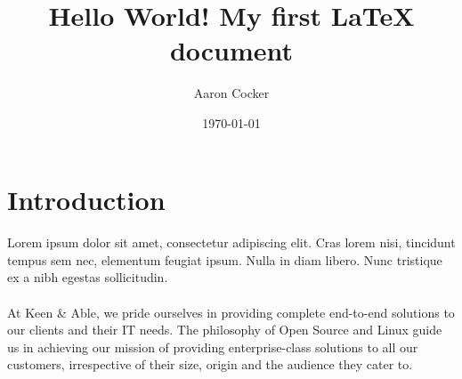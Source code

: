 \documentclass[a4paper,12pt]{article}
\begin{document}
\title{Hello World! My first LaTeX document}
\author{Aaron Cocker}
\date{\today}
\maketitle

\section{Introduction}

\paragraph{}
Lorem ipsum dolor sit amet, consectetur adipiscing elit. Cras lorem nisi, tincidunt tempus sem nec, elementum feugiat ipsum. Nulla in diam libero. Nunc tristique ex a nibh egestas sollicitudin.


\paragraph{}
At Keen & Able, we pride ourselves in providing complete end-to-end solutions to our clients and their IT needs. The philosophy of Open Source and Linux guide us in achieving our mission of providing 
enterprise-class solutions to all our customers, irrespective of their size, origin and the audience they cater to.
\end{document}
